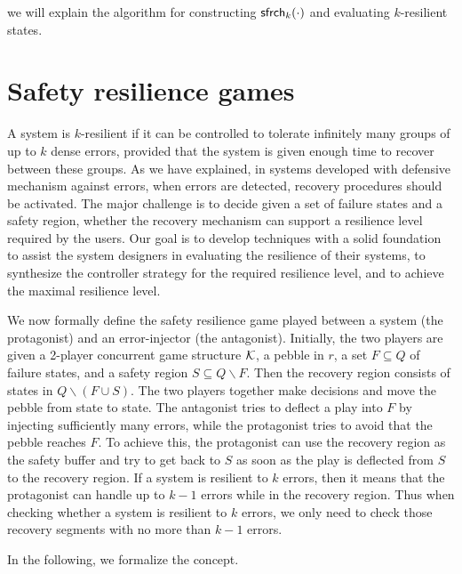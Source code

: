 we will explain the algorithm for constructing $\mathsf{sfrch}_k(\cdot)$ and evaluating $k$-resilient states.


\section{Safety resilience games}
A system is $k$-resilient if it
can be controlled to tolerate infinitely many groups of up to $k$ dense errors, 
provided that the system is given enough time to recover between these groups.
As we have explained, in systems developed with defensive mechanism against errors,  
when errors are detected, recovery procedures should be activated.  
The major challenge is to decide given a set of failure states and a safety region,
whether 
the recovery mechanism can support a resilience level required\label{reply1.prescribed.2.required} by the users. 
Our goal is to develop techniques with a solid foundation to 
assist the system designers in evaluating the resilience of their systems, 
to synthesize the controller strategy for the required resilience level, and 
to achieve the maximal resilience level. 


We now formally define the safety resilience game played between a 
system (the protagonist) and an error-injector (the antagonist).  
Initially, the two players are given a 2-player concurrent game structure ${\cal K}$,  
a pebble in $r$,  
a set $F\subseteq Q$ of failure states, and 
a safety region $S\subseteq Q\smallsetminus F$. 
Then the recovery region consists of states in $Q\smallsetminus (F\cup S)$.  
The two players together make decisions and move the pebble from state to state.   
The antagonist tries to deflect a play into $F$ by injecting sufficiently many errors, while
the protagonist tries to avoid that the pebble reaches $F$. 
To achieve this, the protagonist can use the recovery region as the safety buffer and try to 
get back to $S$ as soon as the play is deflected from $S$ 
to the recovery region.  
If a system is resilient to $k$ errors, then it means that 
the protagonist can handle up to $k-1$ errors while in the recovery region.  
Thus when checking whether a system is resilient to $k$ errors, 
we only need to check those recovery segments with no more than $k-1$ errors. 

In the following, we formalize the concept.  

